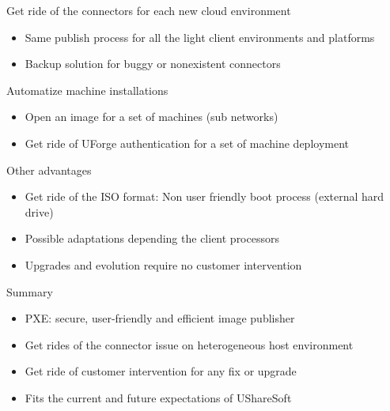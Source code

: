 \documentclass[xcolor=x11names,compress]{beamer}
\renewcommand{\(}{\begin{columns}}
\renewcommand{\)}{\end{columns}}
\newcommand{\<}[1]{\begin{column}{#1}}
\renewcommand{\>}{\end{column}}
\begin{document}
\begin{frame}{Get ride of the connectors for each new cloud environment}
	\begin{itemize}
		\item Same publish process for all the light client environments and platforms
		\item Backup solution for buggy or nonexistent connectors
	\end{itemize}
\end{frame}


\begin{frame}{Automatize machine installations}
	\begin{itemize}
		\item Open an image for a set of machines (sub networks)
		\item Get ride of UForge authentication for a set of machine deployment
	\end{itemize}
\end{frame}


\begin{frame}{Other advantages}
	\begin{itemize}
		\item Get ride of the ISO format: Non user friendly boot process (external hard drive)
		\item Possible adaptations depending the client processors
		\item Upgrades and evolution require no customer intervention
	\end{itemize}
\end{frame}



\begin{frame}{Summary}
	\begin{itemize}
		\item PXE: secure, user-friendly and efficient image publisher
		\item Get rides of the connector issue on heterogeneous host environment
		\item Get ride of customer intervention for any fix or upgrade
		\item Fits the current and future expectations of UShareSoft
	\end{itemize}
\end{frame}
\end{document}
